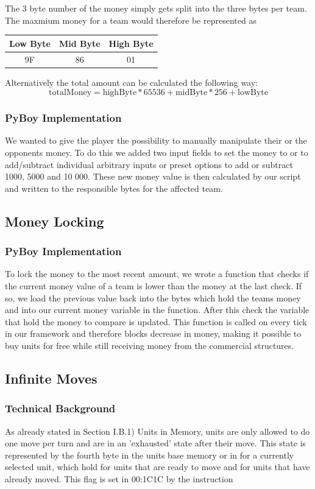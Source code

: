The 3 byte number of the money simply gets split into the three bytes per team. The maxmium money for a team would therefore be represented as

\begin{tabular}{|c|c|c|}
	\hline
	Low Byte & Mid Byte & High Byte \\
	\hline
	9F & 86 & 01 \\
	\hline
\end{tabular}

 Alternatively the total amount can be calculated the following way:
\begin{equation}
	\text{totalMoney} = \text{highByte} * 65 536 + \text{midByte} * 256 + \text{lowByte}
\end{equation}

\subsubsection{PyBoy Implementation}
We wanted to give the player the possibility to manually manipulate their or the opponents money.
To do this we added two input fields to set the money to or to add/subtract individual arbitrary inputs or preset options to add or subtract 1000, 5000 and 10 000.
These new money value is then calculated by our script and written to the responsible bytes for the affected team.


\subsection{Money Locking}
\subsubsection{PyBoy Implementation}
To lock the money to the most recent amount, we wrote a function that checks if the current money value of a team is lower than the money at the last check.
If so, we load the previous value back into the bytes which hold the teams money and into our current money variable in the function.
After this check the variable that hold the money to compare is updated.
This function is called on every tick in our framework and therefore blocks decrease in money, making it possible to buy units for free while still receiving money from the commercial structures.

\subsection{Infinite Moves}
\subsubsection{Technical Background}
As already stated in Section I.B.1) Units in Memory, units are only allowed to do one move per turn and are in an 'exhausted' state after their move. This state is represented by the fourth byte in the units base memory or in  for a currently selected unit, which hold  for units that are ready to move and  for units that have already moved.
This flag is set in 00:1C1C by the instruction

